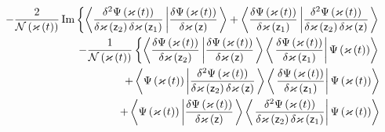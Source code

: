 \begin{eqnarray}
&&-\frac{2}{{\cal N}\left( {\cal \varkappa }\left( t\right) \right) }%
\mathop{\rm Im}%
\left\{ \left\langle \frac{\delta ^{2}\Psi \left( {\cal \varkappa }\left(
t\right) \right) }{\delta \varkappa \left( {\sf z}_{2}\right) \delta {\cal %
\varkappa }\left( {\sf z}_{1}\right) }\left| \frac{\delta \Psi \left( {\cal %
\varkappa }\left( t\right) \right) }{\delta {\cal \varkappa }\left( {\sf z}%
\right) }\right. \right\rangle +\left\langle \frac{\delta \Psi \left( {\cal %
\varkappa }\left( t\right) \right) }{\delta {\cal \varkappa }\left( {\sf z}%
_{1}\right) }\left| \frac{\delta ^{2}\Psi \left( {\cal \varkappa }\left(
t\right) \right) }{\delta \varkappa \left( {\sf z}_{2}\right) \delta {\cal %
\varkappa }\left( {\sf z}\right) }\right. \right\rangle \right.  \nonumber \\
&&-\frac{1}{{\cal N}\left( {\cal \varkappa }\left( t\right) \right) }\left\{
\left\langle \frac{\delta \Psi \left( {\cal \varkappa }\left( t\right)
\right) }{\delta \varkappa \left( {\sf z}_{2}\right) }\left| \frac{\delta
\Psi \left( {\cal \varkappa }\left( t\right) \right) }{\delta {\cal %
\varkappa }\left( {\sf z}\right) }\right. \right\rangle \left\langle \left. 
\frac{\delta \Psi \left( {\cal \varkappa }\left( t\right) \right) }{\delta 
{\cal \varkappa }\left( {\sf z}_{1}\right) }\right| \Psi \left( {\cal %
\varkappa }\left( t\right) \right) \right\rangle \right.  \nonumber \\
&&+\left\langle \Psi \left( {\cal \varkappa }\left( t\right) \right) \left| 
\frac{\delta ^{2}\Psi \left( {\cal \varkappa }\left( t\right) \right) }{%
\delta \varkappa \left( {\sf z}_{2}\right) \delta {\cal \varkappa }\left( 
{\sf z}\right) }\right. \right\rangle \left\langle \left. \frac{\delta \Psi
\left( {\cal \varkappa }\left( t\right) \right) }{\delta {\cal \varkappa }%
\left( {\sf z}_{1}\right) }\right| \Psi \left( {\cal \varkappa }\left(
t\right) \right) \right\rangle  \nonumber \\
&&+\left\langle \Psi \left( {\cal \varkappa }\left( t\right) \right) \left| 
\frac{\delta \Psi \left( {\cal \varkappa }\left( t\right) \right) }{\delta 
{\cal \varkappa }\left( {\sf z}\right) }\right. \right\rangle \left\langle
\left. \frac{\delta ^{2}\Psi \left( {\cal \varkappa }\left( t\right) \right) 
}{\delta \varkappa \left( {\sf z}_{2}\right) \delta {\cal \varkappa }\left( 
{\sf z}_{1}\right) }\right| \Psi \left( {\cal \varkappa }\left( t\right)
\right) \right\rangle  \nonumber \\

\end{eqnarray}
